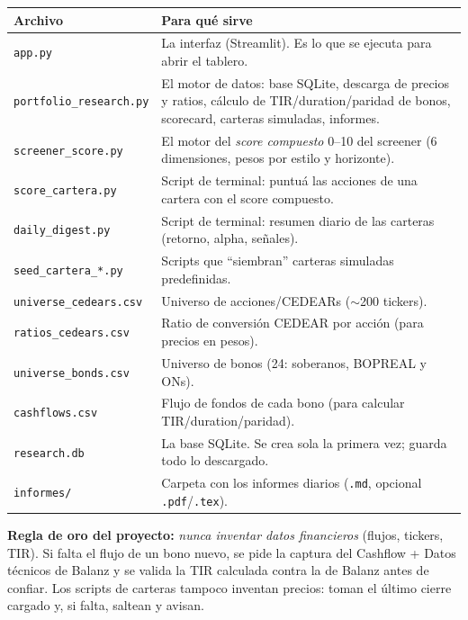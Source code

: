 \documentclass[11pt,a4paper]{article}
\newcommand{\fpath}[1]{\texttt{#1}}
\begin{document}
\begin{longtable}{L{4.4cm} L{9.9cm}}
\toprule
\textbf{Archivo} & \textbf{Para qu\'e sirve} \\
\midrule
\endhead
\fpath{app.py} & La interfaz (Streamlit). Es lo que se ejecuta para abrir el tablero. \\
\fpath{portfolio\_research.py} & El motor de datos: base SQLite, descarga de precios y ratios, c\'alculo de TIR/duration/paridad de bonos, scorecard, carteras simuladas, informes. \\
\fpath{screener\_score.py} & El motor del \emph{score compuesto} 0--10 del screener (6 dimensiones, pesos por estilo y horizonte). \\
\fpath{score\_cartera.py} & Script de terminal: puntu\'a las acciones de una cartera con el score compuesto. \\
\fpath{daily\_digest.py} & Script de terminal: resumen diario de las carteras (retorno, alpha, se\~nales). \\
\fpath{seed\_cartera\_*.py} & Scripts que ``siembran'' carteras simuladas predefinidas. \\
\fpath{universe\_cedears.csv} & Universo de acciones/CEDEARs ($\sim$200 tickers). \\
\fpath{ratios\_cedears.csv} & Ratio de conversi\'on CEDEAR por acci\'on (para precios en pesos). \\
\fpath{universe\_bonds.csv} & Universo de bonos (24: soberanos, BOPREAL y ONs). \\
\fpath{cashflows.csv} & Flujo de fondos de cada bono (para calcular TIR/duration/paridad). \\
\fpath{research.db} & La base SQLite. Se crea sola la primera vez; guarda todo lo descargado. \\
\fpath{informes/} & Carpeta con los informes diarios (\fpath{.md}, opcional \fpath{.pdf}/\fpath{.tex}). \\
\bottomrule
\end{longtable}

\begin{regla}
\textbf{Regla de oro del proyecto:} \emph{nunca inventar datos financieros} (flujos,
tickers, TIR). Si falta el flujo de un bono nuevo, se pide la captura del Cashflow +
Datos t\'ecnicos de Balanz y se valida la TIR calculada contra la de Balanz antes de
confiar. Los scripts de carteras tampoco inventan precios: toman el \'ultimo cierre
cargado y, si falta, saltean y avisan.
\end{regla}

\end{document}
